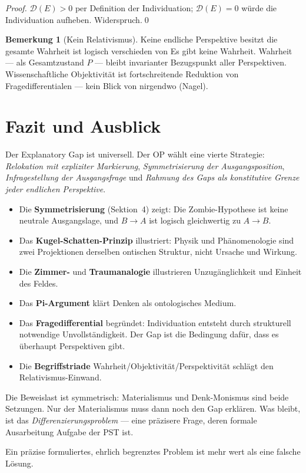 \documentclass[11pt,a4paper]{article}
\theoremstyle{plain}
\theoremstyle{definition}
\newtheorem{remark}{Bemerkung}[section]
\begin{document}
\begin{proof}
$\mathcal{D}(E) > 0$ per Definition der Individuation; $\mathcal{D}(E) = 0$ w\"{u}rde
die Individuation aufheben. Widerspruch.\qed
\end{proof}

\begin{remark}[Kein Relativismus]
\glqq{}Keine endliche Perspektive besitzt die gesamte Wahrheit\grqq{} ist logisch
verschieden von \glqq{}Es gibt keine Wahrheit\grqq{}. Wahrheit --- als Gesamtzustand $P$
--- bleibt invarianter Bezugspunkt aller Perspektiven. Wissenschaftliche Objektivit\"{a}t
ist fortschreitende Reduktion von Fragedifferentialen --- kein \glqq{}Blick von
nirgendwo\grqq{} (Nagel).
\end{remark}

\section{Fazit und Ausblick}

Der Explanatory Gap ist universell. Der OP w\"{a}hlt eine vierte Strategie:
\emph{Relokation mit expliziter Markierung}, \emph{Symmetrisierung der Ausgangsposition},
\emph{Infragestellung der Ausgangsfrage} und \emph{Rahmung des Gaps als konstitutive
Grenze jeder endlichen Perspektive}.

\begin{itemize}
  \item Die \textbf{Symmetrisierung} (Sektion~4) zeigt: Die Zombie-Hypothese ist keine
        neutrale Ausgangslage, und $B \to A$ ist logisch gleichwertig zu $A \to B$.
  \item Das \textbf{Kugel-Schatten-Prinzip} illustriert: Physik und Ph\"{a}nomenologie
        sind zwei Projektionen derselben ontischen Struktur, nicht Ursache und Wirkung.
  \item Die \textbf{Zimmer-} und \textbf{Traumanalogie} illustrieren Unzug\"{a}nglichkeit
        und Einheit des Feldes.
  \item Das \textbf{Pi-Argument} kl\"{a}rt \glqq{}Denken\grqq{} als ontologisches Medium.
  \item Das \textbf{Fragedifferential} begr\"{u}ndet: Individuation entsteht durch
        strukturell notwendige Unvollst\"{a}ndigkeit. Der Gap ist die Bedingung daf\"{u}r,
        dass es \"{u}berhaupt Perspektiven gibt.
  \item Die \textbf{Begriffstriade} Wahrheit/Objektivit\"{a}t/Perspektivit\"{a}t schl\"{a}gt
        den Relativismus-Einwand.
\end{itemize}

Die Beweislast ist symmetrisch: Materialismus und Denk-Monismus sind beide Setzungen.
Nur der Materialismus muss dann noch den Gap erkl\"{a}ren. Was bleibt, ist das
\emph{Differenzierungsproblem} --- eine pr\"{a}zisere Frage, deren formale Ausarbeitung
Aufgabe der PST ist.

Ein pr\"{a}zise formuliertes, ehrlich begrenztes Problem ist mehr wert als eine falsche
L\"{o}sung.
\end{document}
